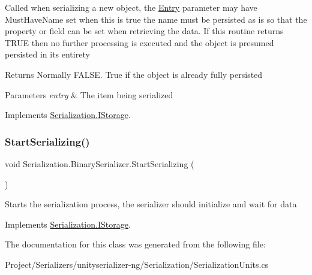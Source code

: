 Called when serializing a new object, the \hyperlink{class_serialization_1_1_entry}{Entry} parameter may have Must\+Have\+Name set when this is true the name must be persisted as is so that the property or field can be set when retrieving the data. If this routine returns T\+R\+UE then no further processing is executed and the object is presumed persisted in its entirety 

\begin{DoxyReturn}{Returns}
Normally F\+A\+L\+SE. True if the object is already fully persisted
\end{DoxyReturn}

\begin{DoxyParams}{Parameters}
{\em entry} & The item being serialized\\
\hline
\end{DoxyParams}


Implements \hyperlink{interface_serialization_1_1_i_storage_a62f447c10caea0bd0c2ec3bad36fe14a}{Serialization.\+I\+Storage}.

\mbox{\label{class_serialization_1_1_binary_serializer_a7266eb0f6366fe0d40bbcb9d4434f262}} 
\subsubsection{\texorpdfstring{Start\+Serializing()}{StartSerializing()}\hspace{0.1cm}{\footnotesize\ttfamily [2/2]}}
{\footnotesize\ttfamily void Serialization.\+Binary\+Serializer.\+Start\+Serializing (\begin{DoxyParamCaption}{ }\end{DoxyParamCaption})\hspace{0.3cm}{\ttfamily [inline]}}



Starts the serialization process, the serializer should initialize and wait for data 



Implements \hyperlink{interface_serialization_1_1_i_storage_a0f040f49872c3bf4ba92a350494e45af}{Serialization.\+I\+Storage}.



The documentation for this class was generated from the following file\+:\begin{DoxyCompactItemize}
\item 
Project/\+Serializers/unityserializer-\/ng/\+Serialization/Serialization\+Units.\+cs\end{DoxyCompactItemize}
